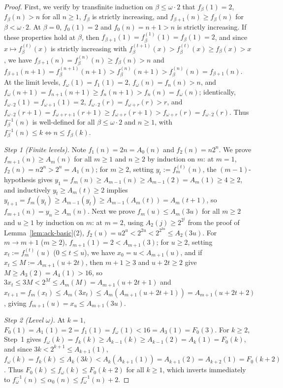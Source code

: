 \documentclass[11pt]{article}
\theoremstyle{definition}
\theoremstyle{remark}
\begin{document}
\begin{proof}
First, we verify by transfinite induction on $\beta \le \omega \cdot 2$ that $f_\beta(1) = 2$, $f_\beta(n) > n$ for all $n \ge 1$, $f_\beta$ is strictly increasing, and $f_{\beta+1}(n) \ge f_\beta(n)$ for $\beta < \omega \cdot 2$. At $\beta = 0$, $f_0(1) = 2$ and $f_0(n) = n + 1 > n$ is strictly increasing. If these properties hold at $\beta$, then $f_{\beta+1}(1) = f_\beta^{(1)}(1) = f_\beta(1) = 2$, and since $x \mapsto f_\beta^{(t)}(x)$ is strictly increasing with $f_\beta^{(t+1)}(x) > f_\beta^{(t)}(x) \ge f_\beta(x) > x$, we have $f_{\beta+1}(n) = f_\beta^{(n)}(n) \ge f_\beta(n) > n$ and $f_{\beta+1}(n + 1) = f_\beta^{(n+1)}(n + 1) > f_\beta^{(n)}(n + 1) > f_\beta^{(n)}(n) = f_{\beta+1}(n)$. At the limit levels, $f_\omega(1) = f_1(1) = 2$, $f_\omega(n) = f_n(n) > n$, and $f_\omega(n + 1) = f_{n+1}(n + 1) \ge f_n(n + 1) > f_n(n) = f_\omega(n)$; identically, $f_{\omega \cdot 2}(1) = f_{\omega + 1}(1) = 2$, $f_{\omega \cdot 2}(r) = f_{\omega + r}(r) > r$, and $f_{\omega \cdot 2}(r + 1) = f_{\omega + r + 1}(r + 1) \ge f_{\omega + r}(r + 1) > f_{\omega + r}(r) = f_{\omega \cdot 2}(r)$. Thus $f_\beta^{-1}(n)$ is well-defined for all $\beta \le \omega \cdot 2$ and $n \ge 1$, with $f_\beta^{-1}(n) \le k \iff n \le f_\beta(k)$.

\emph{Step 1 (Finite levels).} Note $f_1(n) = 2n = A_0(n)$ and $f_2(n) = n 2^n$. We prove $f_{m+1}(n) \ge A_m(n)$ for all $m \ge 1$ and $n \ge 2$ by induction on $m$: at $m = 1$, $f_2(n) = n 2^n > 2^n = A_1(n)$; for $m \ge 2$, setting $y_t := f_m^{(t)}(n)$, the $(m - 1)$-hypothesis gives $y_1 = f_m(n) \ge A_{m-1}(n) \ge A_{m-1}(2) = A_m(1) \ge 4 \ge 2$, and inductively $y_t \ge A_m(t) \ge 2$ implies $y_{t+1} = f_m(y_t) \ge A_{m-1}(y_t) \ge A_{m-1}(A_m(t)) = A_m(t + 1)$, so $f_{m+1}(n) = y_n \ge A_m(n)$. Next we prove $f_m(u) \le A_m(3u)$ for all $m \ge 2$ and $u \ge 1$ by induction on $m$: at $m = 2$, using $A_2(j) \ge 2^{2^j}$ from the proof of Lemma~\ref{lem:ack-basic}(2), $f_2(u) = u 2^u < 2^{2u} < 2^{2^{3u}} \le A_2(3u)$. For $m \to m + 1$ ($m \ge 2$), $f_{m+1}(1) = 2 < A_{m+1}(3)$; for $u \ge 2$, setting $x_t := f_m^{(t)}(u)$ ($0 \le t \le u$), we have $x_0 = u < A_{m+1}(u)$, and if $x_t \le M := A_{m+1}(u + 2t)$, then $m + 1 \ge 3$ and $u + 2t \ge 2$ give $M \ge A_3(2) = A_4(1) > 16$, so $3 x_t \le 3 M < 2^M \le A_m(M) = A_{m+1}(u + 2t + 1)$ and $x_{t+1} = f_m(x_t) \le A_m(3 x_t) \le A_m(A_{m+1}(u + 2t + 1)) = A_{m+1}(u + 2t + 2)$, giving $f_{m+1}(u) = x_u \le A_{m+1}(3u)$.

\emph{Step 2 (Level $\omega$).} At $k = 1$, $F_0(1) = A_1(1) = 2 = f_1(1) = f_\omega(1) < 16 = A_3(1) = F_0(3)$. For $k \ge 2$, Step~1 gives $f_\omega(k) = f_k(k) \ge A_{k-1}(k) \ge A_{k-1}(2) = A_k(1) = F_0(k)$, and since $3k < 2^{k+1} \le A_{k+1}(1)$, $f_\omega(k) = f_k(k) \le A_k(3k) < A_k(A_{k+1}(1)) = A_{k+1}(2) = A_{k+2}(1) = F_0(k + 2)$. Thus $F_0(k) \le f_\omega(k) \le F_0(k + 2)$ for all $k \ge 1$, which inverts immediately to $f_\omega^{-1}(n) \le \alpha_0(n) \le f_\omega^{-1}(n) + 2$.


\end{proof}
\end{document}
